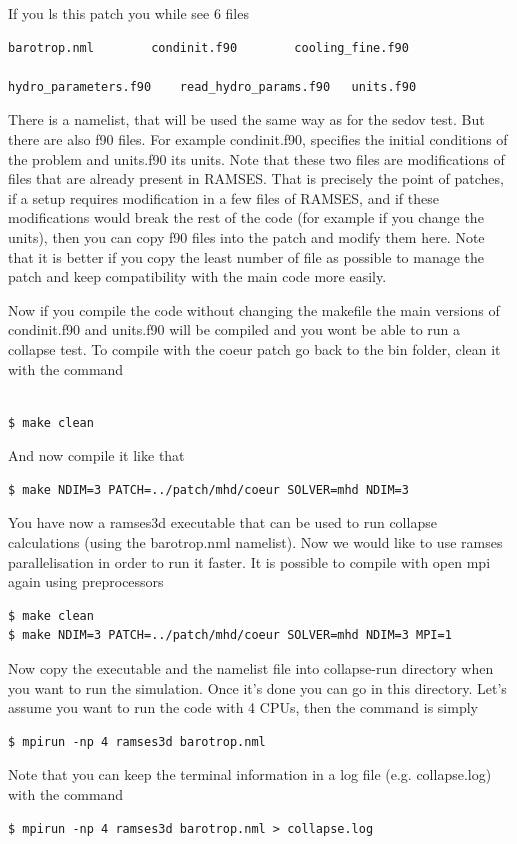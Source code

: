 \documentclass{article}
\begin{document}
If you ls this patch you while see 6 files
\begin{lstlisting}[]
barotrop.nml		condinit.f90		cooling_fine.f90

hydro_parameters.f90	read_hydro_params.f90	units.f90
\end{lstlisting}
There is a namelist, that will be used the same way as for the sedov test. But there are also f90 files. For example condinit.f90, specifies the initial conditions of the problem and units.f90 its units. Note that these two files are modifications of files that are already present in RAMSES. That is precisely the point of patches, if a setup requires modification in a few files of RAMSES, and if these modifications would break the rest of the code (for example if you change the units), then you can copy f90 files into the patch and modify them here. Note that it is better if you copy the least number of file as possible to manage the patch and keep compatibility with the main code more easily.  

Now if you compile the code without changing the makefile the main versions of condinit.f90 and units.f90 will be compiled and you wont be able to run a collapse test. To compile with the coeur patch go back to the bin folder, clean it with the command
\begin{lstlisting}[]

$ make clean

\end{lstlisting}
And now compile it like that 
\begin{lstlisting}[]
$ make NDIM=3 PATCH=../patch/mhd/coeur SOLVER=mhd NDIM=3
\end{lstlisting}
You have now a ramses3d executable that can be used to run collapse calculations (using the barotrop.nml namelist). Now we would like to use ramses parallelisation in order to run it faster. It is possible to compile with open mpi again using preprocessors
\begin{lstlisting}[]
$ make clean
$ make NDIM=3 PATCH=../patch/mhd/coeur SOLVER=mhd NDIM=3 MPI=1
\end{lstlisting}

Now copy the executable and the namelist file into  collapse-run directory when you want to run the simulation. Once it's done you can go in this directory. Let's assume you want to run the code with 4 CPUs, then the command is simply 
\begin{lstlisting}[]
$ mpirun -np 4 ramses3d barotrop.nml
\end{lstlisting}
Note that you can keep the terminal information in a log file (e.g. collapse.log) with the command 
\begin{lstlisting}[]
$ mpirun -np 4 ramses3d barotrop.nml > collapse.log
\end{lstlisting}
\end{document}
